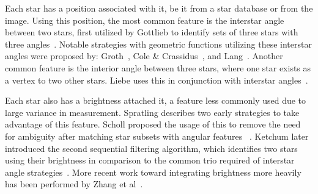 Each star has a position associated with it, be it from a star database or from the image.
Using this position, the most common feature is the interstar angle between two stars, first utilized by Gottlieb to
identify sets of three stars with three angles~\cite{gottlieb:spacecraftAttitudeDetermination}.
Notable strategies with geometric functions utilizing these interstar angles were proposed by:
Groth~\cite{groth:patternMatchingMethod}, Cole \&
Crassidus~\cite{coleAndCrassidis:sphericalTriangleMethod,coleAndCrassidis:planarTriangleMethod}, and
Lang~\cite{lang:astrometryDotNet}.
Another common feature is the interior angle between three stars, where one star exists as a vertex to two other stars.
Liebe uses this in conjunction with interstar angles~\cite{liebe:starTrackersAttitudeDetermination}.



Each star also has a brightness attached it, a feature less commonly used due to large variance in measurement.
Spratling describes two early strategies to take advantage of this feature.
Scholl proposed the usage of this to remove the need for ambiguity after matching star subsets with angular features
~\cite{scholl:starFieldIdentification}.
Ketchum later introduced the second sequential filtering algorithm, which identifies two stars using their brightness
in comparison to the common trio required of interstar angle strategies~\cite{ketchum:onboardStarIdentification}.
More recent work toward integrating brightness more heavily has been performed by Zhang et
al~\cite{zhang:brightnessReferenced}.

